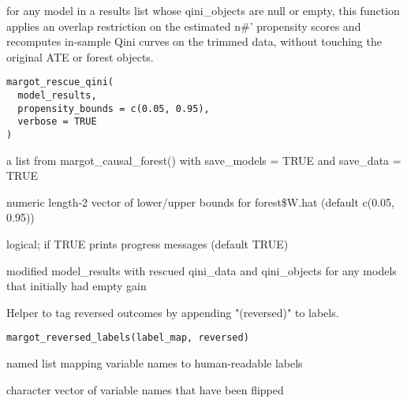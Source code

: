 \documentclass[a4paper]{book}
\begin{document}
%
\begin{Description}
for any model in a results list whose qini\_objects are null or empty,
this function applies an overlap restriction on the estimated\bsl{} n\#' propensity scores and recomputes in‑sample Qini curves on the trimmed data,
without touching the original ATE or forest objects.
\end{Description}
%
\begin{Usage}
\begin{verbatim}
margot_rescue_qini(
  model_results,
  propensity_bounds = c(0.05, 0.95),
  verbose = TRUE
)
\end{verbatim}
\end{Usage}
%
\begin{Arguments}
\begin{ldescription}
\item[\code{model\_results}] a list from margot\_causal\_forest() with
save\_models = TRUE and save\_data = TRUE

\item[\code{propensity\_bounds}] numeric length‑2 vector of lower/upper
bounds for forest\$W.hat (default c(0.05, 0.95))

\item[\code{verbose}] logical; if TRUE prints progress messages (default TRUE)
\end{ldescription}
\end{Arguments}
%
\begin{Value}
modified model\_results with rescued qini\_data and qini\_objects
for any models that initially had empty gain
\end{Value}
%
\begin{Description}
Helper to tag reversed outcomes by appending "(reversed)" to labels.
\end{Description}
%
\begin{Usage}
\begin{verbatim}
margot_reversed_labels(label_map, reversed)
\end{verbatim}
\end{Usage}
%
\begin{Arguments}
\begin{ldescription}
\item[\code{label\_map}] named list mapping variable names to human-readable labels

\item[\code{reversed}] character vector of variable names that have been flipped
\end{ldescription}
\end{Arguments}
\end{document}

